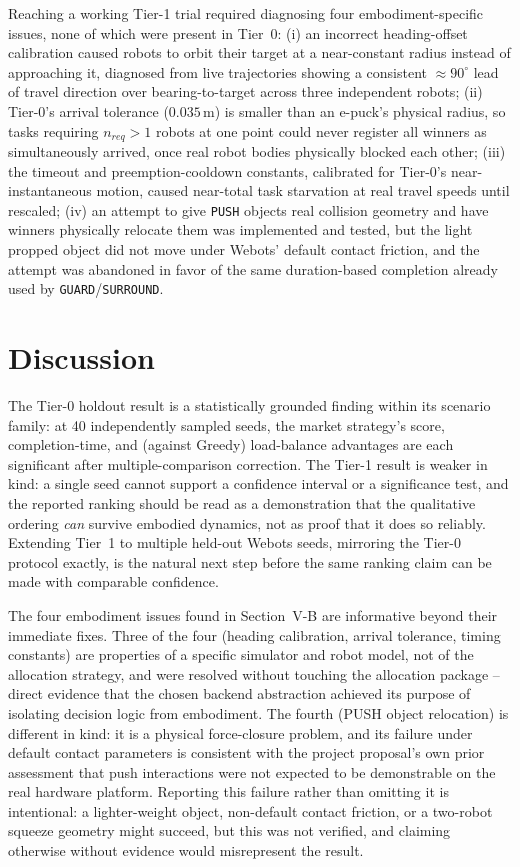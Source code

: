 \documentclass[conference]{IEEEtran}
\begin{document}
Reaching a working Tier-1 trial required diagnosing four
embodiment-specific issues, none of which were present in Tier~0:
(i) an incorrect heading-offset calibration caused robots to orbit their
target at a near-constant radius instead of approaching it, diagnosed
from live trajectories showing a consistent $\approx\!90^{\circ}$ lead of
travel direction over bearing-to-target across three independent robots;
(ii) Tier-0's arrival tolerance ($0.035\,\mathrm{m}$) is smaller than an
e-puck's physical radius, so tasks requiring $n_{req}>1$ robots at one
point could never register all winners as simultaneously arrived, once
real robot bodies physically blocked each other; (iii) the timeout and
preemption-cooldown constants, calibrated for Tier-0's near-instantaneous
motion, caused near-total task starvation at real travel speeds until
rescaled; (iv) an attempt to give \texttt{PUSH} objects real collision
geometry and have winners physically relocate them was implemented and
tested, but the light propped object did not move under Webots' default
contact friction, and the attempt was abandoned in favor of the same
duration-based completion already used by \texttt{GUARD}/\texttt{SURROUND}.

\section{Discussion}

The Tier-0 holdout result is a statistically grounded finding within its
scenario family: at 40 independently sampled seeds, the market strategy's
score, completion-time, and (against Greedy) load-balance advantages are
each significant after multiple-comparison correction. The Tier-1 result
is weaker in kind: a single seed cannot support a confidence interval or
a significance test, and the reported ranking should be read as a
demonstration that the qualitative ordering \emph{can} survive embodied
dynamics, not as proof that it does so reliably. Extending Tier~1 to
multiple held-out Webots seeds, mirroring the Tier-0 protocol exactly,
is the natural next step before the same ranking claim can be made with
comparable confidence.

The four embodiment issues found in Section~V-B are informative beyond
their immediate fixes. Three of the four (heading calibration, arrival
tolerance, timing constants) are properties of a specific simulator and
robot model, not of the allocation strategy, and were resolved without
touching the allocation package -- direct evidence that the chosen
backend abstraction achieved its purpose of isolating decision logic
from embodiment. The fourth (PUSH object relocation) is different in
kind: it is a physical force-closure problem, and its failure under
default contact parameters is consistent with the project proposal's own
prior assessment that push interactions were not expected to be
demonstrable on the real hardware platform. Reporting this failure
rather than omitting it is intentional: a lighter-weight object,
non-default contact friction, or a two-robot squeeze geometry might
succeed, but this was not verified, and claiming otherwise without
evidence would misrepresent the result.
\end{document}
